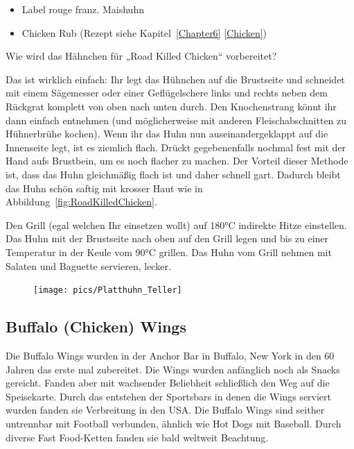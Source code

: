 \begin{itemize}[noitemsep]
	\item Label rouge franz. Maishuhn
	\item Chicken Rub (Rezept siehe Kapitel~\ref{Chapter6} \vref{Chicken})
\end{itemize}

Wie wird das Hähnchen für „Road Killed Chicken“ vorbereitet?

Das ist wirklich einfach: Ihr legt das Hühnchen auf die Brustseite und 
schneidet mit einem Sägemesser oder einer Geflügelschere links und 
rechts neben dem Rückgrat komplett von oben nach unten durch. Den 
Knochenstrang könnt ihr dann einfach entnehmen (und möglicherweise 
mit anderen Fleischabschnitten zu Hühnerbrühe kochen). Wenn ihr das 
Huhn nun auseinandergeklappt auf die Innenseite legt, ist es ziemlich 
flach. Drückt gegebenenfalls nochmal fest mit der Hand aufs Brustbein, 
um es noch flacher zu machen. Der Vorteil dieser Methode ist, dass das 
Huhn gleichmäßig flach ist und daher schnell gart. Dadurch bleibt das 
Huhn schön saftig mit krosser Haut wie in 
Abbildung~\vref{fig:RoadKilledChicken}.

Den Grill (egal welchen Ihr einsetzen wollt) auf 180°C indirekte Hitze 
einstellen.
Das Huhn mit der Brustseite nach oben auf den Grill legen und bis zu 
einer Temperatur in der Keule vom 90°C grillen. Das Huhn vom Grill 
nehmen mit Salaten und Baguette servieren, lecker.
\newpage

\begin{figure}[htbp]
	\centering
	\begin{minipage}{1\textwidth}
		\centering
		\texttt{[image: pics/Platthuhn\_Teller]}
		\label{fig:RoadKilledChicken}
	\end{minipage}
\end{figure}
\newpage

\subsection{Buffalo (Chicken) Wings}
Die Buffalo Wings wurden in der Anchor Bar in Buffalo, New York in den 60 
Jahren das erste mal 
zubereitet. Die Wings wurden anfänglich 
noch als Snacks gereicht. Fanden aber mit wachsender Beliebheit schließlich 
den Weg auf die 
Speisekarte. Durch das entstehen der 
Sportsbars in denen die Wings serviert wurden fanden sie Verbreitung in den 
USA. Die Buffalo 
Wings sind seither untrennbar mit Football 
verbunden, ähnlich wie Hot Dogs mit Baseball. Durch diverse Fast Food-Ketten 
fanden sie bald 
weltweit Beachtung.

